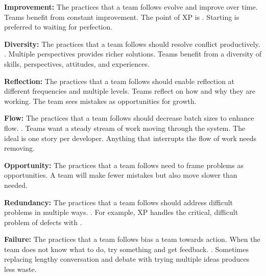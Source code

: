 \textbf{Improvement:} The practices that a team follows evolve and improve over time. Teams benefit from constant improvement. The point of XP is  \cite{BeckExtremeProgramming2004}. Starting is preferred to waiting for perfection. 

\textbf{Diversity:} The practices that a team follows should resolve conflict productively.   \cite{BeckExtremeProgramming2004}. Multiple perspectives provides richer solutions. Teams benefit from a diversity of skills, perspectives, attitudes, and experiences.

\textbf{Reflection:} The practices that a team follows should enable reflection at different frequencies and multiple levels. Teams reflect on how and why they are working. The team sees mistakes as opportunities for growth.

\textbf{Flow:} The practices that a team follows should decrease batch sizes to enhance flow.   \cite{BeckExtremeProgramming2004}. Teams want a steady stream of work moving through the system. The ideal  is one story per developer. Anything that interrupts the flow of work needs removing. 

\textbf{Opportunity:} The practices that a team follows need to frame problems as opportunities. A team  will make fewer mistakes but also move slower than needed.

\textbf{Redundancy:} The practices that a team follows should address difficult problems in multiple ways.  \cite{BeckExtremeProgramming2004}. For example, XP handles the critical, difficult problem of defects with   \cite{BeckExtremeProgramming2004}. 


\textbf{Failure:} The practices that a team follows bias a team towards action. When the team does not know what to do, try something and get feedback.  \cite{BeckExtremeProgramming2004}. Sometimes replacing lengthy conversation and debate with trying multiple ideas produces less waste.

